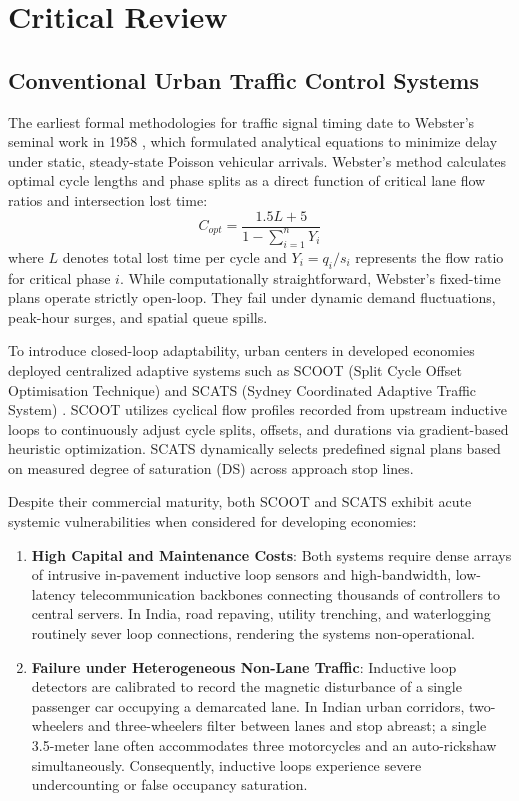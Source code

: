 \documentclass[12pt,a4paper,oneside]{report}
\begin{document}
\section{Critical Review}
\label{sec:critical_review}

\subsection{Conventional Urban Traffic Control Systems}
The earliest formal methodologies for traffic signal timing date to Webster's seminal work in 1958 \cite{ref_webster1958}, which formulated analytical equations to minimize delay under static, steady-state Poisson vehicular arrivals. Webster's method calculates optimal cycle lengths and phase splits as a direct function of critical lane flow ratios and intersection lost time:
\begin{equation}
C_{opt} = \frac{1.5L + 5}{1 - \sum_{i=1}^n Y_i}
\end{equation}
where $L$ denotes total lost time per cycle and $Y_i = q_i / s_i$ represents the flow ratio for critical phase $i$. While computationally straightforward, Webster's fixed-time plans operate strictly open-loop. They fail under dynamic demand fluctuations, peak-hour surges, and spatial queue spills.

To introduce closed-loop adaptability, urban centers in developed economies deployed centralized adaptive systems such as SCOOT (Split Cycle Offset Optimisation Technique) \cite{ref_hunt1981} and SCATS (Sydney Coordinated Adaptive Traffic System) \cite{ref_scats1980}. SCOOT utilizes cyclical flow profiles recorded from upstream inductive loops to continuously adjust cycle splits, offsets, and durations via gradient-based heuristic optimization. SCATS dynamically selects predefined signal plans based on measured degree of saturation (DS) across approach stop lines.

Despite their commercial maturity, both SCOOT and SCATS exhibit acute systemic vulnerabilities when considered for developing economies:
\begin{enumerate}
    \item \textbf{High Capital and Maintenance Costs}: Both systems require dense arrays of intrusive in-pavement inductive loop sensors and high-bandwidth, low-latency telecommunication backbones connecting thousands of controllers to central servers. In India, road repaving, utility trenching, and waterlogging routinely sever loop connections, rendering the systems non-operational.
    \item \textbf{Failure under Heterogeneous Non-Lane Traffic}: Inductive loop detectors are calibrated to record the magnetic disturbance of a single passenger car occupying a demarcated lane. In Indian urban corridors, two-wheelers and three-wheelers filter between lanes and stop abreast; a single 3.5-meter lane often accommodates three motorcycles and an auto-rickshaw simultaneously. Consequently, inductive loops experience severe undercounting or false occupancy saturation.
\end{enumerate}
\end{document}
